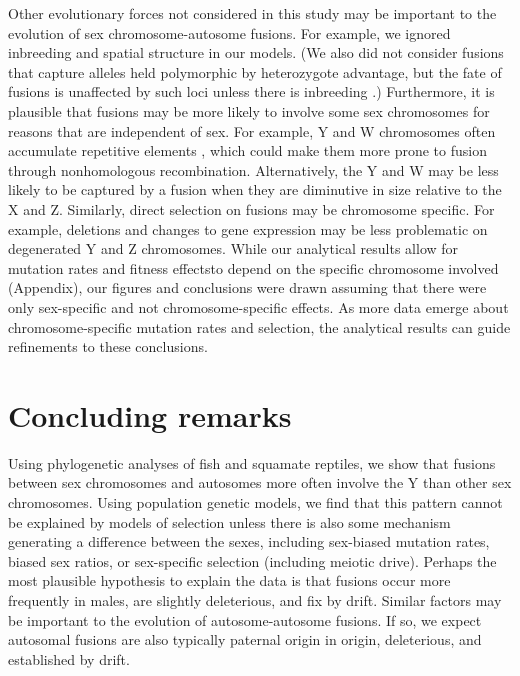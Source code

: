Other evolutionary forces not considered in this study may be important to the evolution of sex chromosome-autosome fusions. For example, we ignored inbreeding and spatial structure in our models. (We also did not consider fusions that capture alleles held polymorphic by heterozygote advantage, but the fate of fusions is unaffected by such loci \citep{Charlesworth1980} unless there is inbreeding \citep{Charlesworth1999}.)
Furthermore, it is plausible that fusions may be more likely to involve some sex chromosomes for reasons that are independent of sex. For example, Y and W chromosomes often accumulate repetitive elements \citep{Bull1983, Charlesworth2005}, which could make them more prone to fusion through nonhomologous recombination. Alternatively, the Y and W may be less likely to be captured by a fusion when they are diminutive in size relative to the X and Z. Similarly, direct selection on fusions may be chromosome specific. For example, deletions and changes to gene expression may be less problematic on degenerated Y and Z chromosomes. While our analytical results allow for mutation rates and fitness effectsto depend on the specific chromosome involved (Appendix), our figures and conclusions were drawn assuming that there were only sex-specific and not chromosome-specific effects. As more data emerge about chromosome-specific mutation rates and selection, the analytical results can guide refinements to these conclusions. 

\section{Concluding remarks}

Using phylogenetic analyses of fish and squamate reptiles, we show that fusions between sex chromosomes and autosomes more often involve the Y than other sex chromosomes. Using population genetic models, we find that this pattern cannot be explained by models of selection unless there is also some mechanism generating a difference between the sexes, including sex-biased mutation rates, biased sex ratios, or sex-specific selection (including meiotic drive). Perhaps the most plausible hypothesis to explain the data is that fusions occur more frequently in males, are slightly deleterious, and fix by drift. Similar factors may be important to the evolution of autosome-autosome fusions. If so, we expect autosomal fusions are also typically paternal origin in origin, deleterious, and established by drift.




